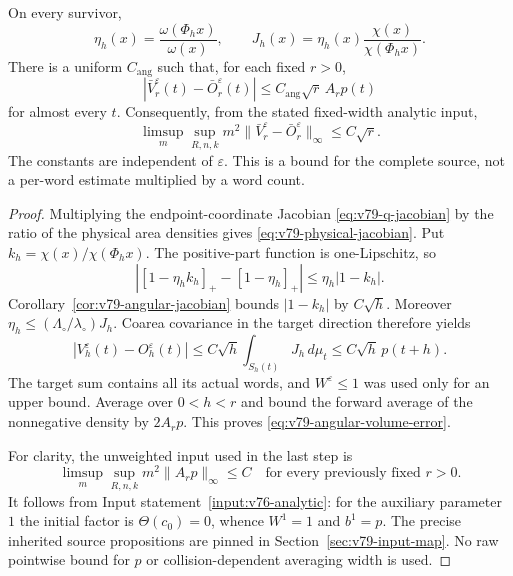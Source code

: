 \begin{theorem}
\label{thm:v79-volume-factorization}
On every survivor,
\begin{equation}\label{eq:v79-physical-jacobian}
 \eta_h(x)=\frac{\omega(\Phi_hx)}{\omega(x)},\qquad
 J_h(x)=\eta_h(x)\frac{\chi(x)}{\chi(\Phi_hx)}.
\end{equation}
There is a uniform $C_{\mathrm{ang}}$ such that, for each fixed $r>0$,
\begin{equation}\label{eq:v79-angular-volume-error}
 |\bar V_r^\varepsilon(t)-\bar O_r^\varepsilon(t)|
                            \le C_{\mathrm{ang}}\sqrt r\,A_rp(t)
\end{equation}
for almost every $t$. Consequently, from the stated fixed-width
analytic input,
\begin{equation}\label{eq:v79-complete-angular-bound}
 \limsup_m\sup_{R,n,k}m^2
       \|\bar V_r^\varepsilon-\bar O_r^\varepsilon\|_\infty
                                             \le C\sqrt r.
\end{equation}
The constants are independent of $\varepsilon$. This is a bound for
the complete source, not a per-word estimate multiplied by a word count.
\end{theorem}
\begin{proof}
Multiplying the endpoint-coordinate Jacobian
\eqref{eq:v79-q-jacobian} by the ratio of the physical area densities
gives \eqref{eq:v79-physical-jacobian}. Put
$k_h=\chi(x)/\chi(\Phi_hx)$. The positive-part function is
one-Lipschitz, so
\[
 |[1-\eta_hk_h]_+-[1-\eta_h]_+|
                         \le\eta_h|1-k_h|.
\]
Corollary~\ref{cor:v79-angular-jacobian} bounds $|1-k_h|$ by
$C\sqrt h$. Moreover $\eta_h\le(\Lambda_\circ/\lambda_\circ)J_h$.
Coarea covariance in the target direction therefore yields
\[
 |V_h^\varepsilon(t)-O_h^\varepsilon(t)|
 \le C\sqrt h\int_{S_h(t)}J_h\,d\mu_t
 \le C\sqrt h\,p(t+h).
\]
The target sum contains all its actual words, and $W^\varepsilon\le1$
was used only for an upper bound. Average over $0<h<r$ and bound the
forward average of the nonnegative density by $2A_rp$.
This proves \eqref{eq:v79-angular-volume-error}.

For clarity, the unweighted input used in the last step is
\[
 \limsup_m\sup_{R,n,k}m^2\|A_rp\|_\infty\le C
 \quad\text{for every previously fixed }r>0.
\]
It follows from Input statement~\ref{input:v76-analytic}: for the auxiliary
parameter $1$ the initial factor is $\Theta(c_0)=0$, whence $W^1=1$
and $b^1=p$. The precise inherited source propositions are pinned in
Section~\ref{sec:v79-input-map}. No raw pointwise bound for $p$ or
collision-dependent averaging width is used.
\end{proof}

